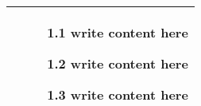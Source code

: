 \documentclass{article}
\begin{document}
\begin{table}
\begin{tabularx}{\textwidth}[t]{XX}
\begin{description}
\end{description}
&
\begin{minipage}[t]{\linewidth}%
\begin{itemize}
\item[1.1] write content here %
\item[1.2] write content here %
\item[1.3] write content here %
\end{itemize}
\end{minipage}\\
\hline

\end{tabularx}
\end{table}
\end{document}
